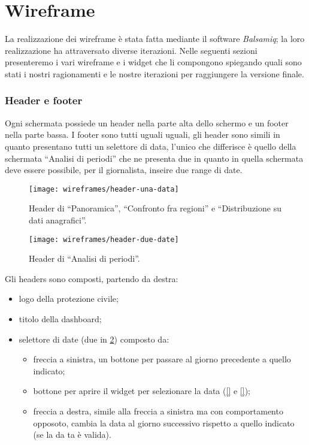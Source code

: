 \section{Wireframe}\label{s:wireframe}
La realizzazione dei wireframe è stata fatta mediante il software \textit{Balsamiq}; la loro realizzazione ha attraversato diverse iterazioni. Nelle seguenti sezioni presenteremo i vari wireframe e i widget che li compongono spiegando quali sono stati i nostri ragionamenti e le nostre iterazioni per raggiungere la versione finale.\\

\subsubsection{Header e footer}\label{ss:header-e-footer}
Ogni schermata possiede un header nella parte alta dello schermo e un footer nella parte bassa. I footer sono tutti uguali uguali, gli header sono simili in quanto presentano tutti un selettore di data, l'unico che differisce è quello della schermata ``Analisi di periodi'' che ne presenta due in quanto in quella schermata deve essere possibile, per il giornalista, inseire due range di date.

\begin{figure}[H]
    \centering
    \texttt{[image: wireframes/header-una-data]}
    \caption{Header di ``Panoramica'', ``Confronto fra regioni'' e ``Distribuzione su dati anagrafici''.}
    \label{fig:header-una-data}
\end{figure}

\begin{figure}[H]
    \centering
    \texttt{[image: wireframes/header-due-date]}
    \caption{Header di ``Analisi di periodi''.}
    \label{fig:header-due-date}
\end{figure}

Gli headers sono composti, partendo da destra:
\begin{itemize}
    \item logo della protezione civile;
    \item titolo della dashboard;
    \item selettore di date (due in \ref{fig:header-due-date}) composto da:
        \begin{itemize}
            \item freccia a sinistra, un bottone per passare al giorno precedente a quello indicato;
            \item bottone per aprire il widget per selezionare la data (\ref{} e \ref{});
            \item freccia a destra, simile alla freccia a sinistra ma con comportamento opposoto, cambia la data al giorno successivo rispetto a quello indicato (se la da ta è valida).
        \end{itemize}
\end{itemize}

